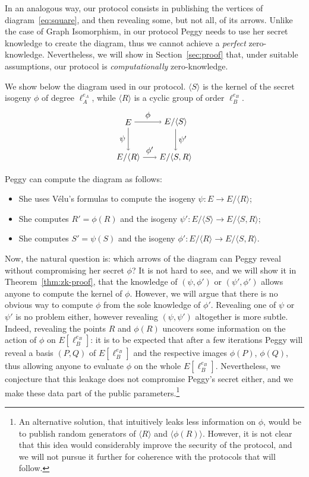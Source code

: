 \documentclass[jmc]{degruyter-journal-a}
\theoremstyle{definition}
\newcommand{\cyc}[1]{{\langle #1 \rangle}}
\begin{document}
In an analogous way, our protocol consists in publishing the vertices
of diagram~\eqref{eq:square}, and then revealing some, but not all, of
its arrows. Unlike the case of Graph Isomorphism, in our protocol
Peggy needs to use her secret knowledge to create the diagram, thus we
cannot achieve a \emph{perfect} zero-knowledge. Nevertheless, we will
show in Section~\ref{sec:proof} that, under suitable assumptions, our
protocol is \emph{computationally} zero-knowledge.

We show below the diagram used in our protocol. $\cyc{S}$ is the
kernel of the secret isogeny $\phi$ of degree $\ell_A^{e_A}$, while
$\cyc{R}$ is a cyclic group of order $\ell_B^{e_B}$.
\begin{equation}
  \label{eq:zk}
  \begin{tikzpicture}[xscale=2,yscale=1.5,baseline=(current bounding box.east)]
    \node(0) at (0,0) {$E$};
    \node(S) at (1,0) {$E/\cyc{S}$};
    \node(R) at (0,-1) {$E/\cyc{R}$};
    \node(SR) at (1,-1) {$E/\cyc{S,R}$};
    \path[->] (0) edge node[auto] {$\phi$} (S);
    \path[->] (0) edge node[auto,swap] {$\psi$} (R);
    \path[->] (S) edge node[auto] {$\psi'$} (SR);
    \path[->] (R) edge node[auto] {$\phi'$} (SR);
  \end{tikzpicture}
\end{equation}

Peggy can compute the diagram as follows:
\begin{itemize}
\item She uses V\'elu's formulas to compute the isogeny $\psi:E\to
  E/\cyc{R}$;
\item She computes $R' = \phi(R)$ and the isogeny $\psi':E/\cyc{S}\to
  E/\cyc{S,R}$;
\item She computes $S' = \psi(S)$ and the isogeny
  $\phi':E/\cyc{R}\to E/\cyc{S,R}$.
\end{itemize}

Now, the natural question is: which arrows of the diagram can Peggy
reveal without compromising her secret $\phi$? It is not hard to see,
and we will show it in Theorem~\ref{thm:zk-proof}, that the knowledge
of $(\psi,\phi')$ or $(\psi',\phi')$ allows anyone to compute the
kernel of $\phi$. However, we will argue that there is no obvious way
to compute $\phi$ from the sole knowledge of $\phi'$. Revealing one of
$\psi$ or $\psi'$ is no problem either, however revealing
$(\psi,\psi')$ altogether is more subtle. Indeed, revealing the points
$R$ and $\phi(R)$ uncovers some information on the action of $\phi$ on
$E[\ell_B^{e_B}]$: it is to be expected that after a few iterations
Peggy will reveal a basis $(P,Q)$ of $E[\ell_B^{e_B}]$ and the
respective images $\phi(P)$, $\phi(Q)$, thus allowing anyone to
evaluate $\phi$ on the whole $E[\ell_B^{e_B}]$. Nevertheless, we
conjecture that this leakage does not compromise Peggy's secret
either, and we make these data part of the public
parameters.\footnote{An alternative solution, that intuitively leaks
  less information on $\phi$, would be to publish random generators of
  $\cyc{R}$ and $\cyc{\phi(R)}$.  However, it is not clear that this
  idea would considerably improve the security of the protocol, and we
  will not pursue it further for coherence with the protocols that
  will follow.}
\end{document}
